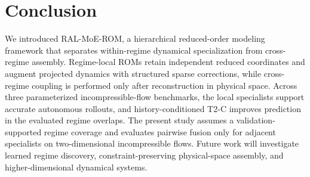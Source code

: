 \section{Conclusion}

We introduced RAL-MoE-ROM, a hierarchical reduced-order modeling framework that separates within-regime dynamical specialization from cross-regime assembly. Regime-local ROMs retain independent reduced coordinates and augment projected dynamics with structured sparse corrections, while
cross-regime coupling is performed only after reconstruction in physical space. Across three parameterized incompressible-flow benchmarks, the local specialists support accurate autonomous rollouts, and history-conditioned T2-C improves prediction in the evaluated regime overlaps. The present study assumes a validation-supported regime coverage and evaluates pairwise fusion only for adjacent specialists on two-dimensional incompressible flows. Future work will investigate learned regime discovery, constraint-preserving physical-space assembly, and higher-dimensional dynamical systems.

